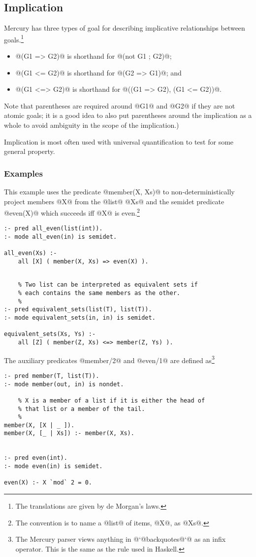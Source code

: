 \documentclass[a4paper,11pt,notitlepage,onecolumn]{article}
\begin{document}
\subsection{Implication}

Mercury has three types of goal for describing implicative
relationships between goals.\footnote{The translations are given by de Morgan's laws.}
\begin{itemize}
\item @(G1 => G2)@ is shorthand for @(not G1 ; G2)@;
\item @(G1 <= G2)@ is shorthand for @(G2 => G1)@; and
\item @(G1 <=> G2)@ is shorthand for @((G1 => G2), (G1 <= G2))@.
\end{itemize}

Note that parentheses are required around @G1@ and @G2@ if they
are not atomic goals; it is a good idea to also put
parentheses around the implication as a whole to avoid
ambiguity in the scope of the implication.)

Implication is most often used with universal quantification
to test for some general property.

\subsubsection{Examples}

This example uses the predicate @member(X, Xs)@ to non-deterministically
project members @X@ from the @list@ @Xs@ and the semidet predicate
@even(X)@ which succeeds iff @X@ is even.\footnote{The convention is to
name a @list@ of items, @X@, as @Xs@.}
\begin{verbatim}
:- pred all_even(list(int)).
:- mode all_even(in) is semidet.

all_even(Xs) :-
    all [X] ( member(X, Xs) => even(X) ).

\end{verbatim}

\begin{verbatim}

    % Two list can be interpreted as equivalent sets if
    % each contains the same members as the other.
    %
:- pred equivalent_sets(list(T), list(T)).
:- mode equivalent_sets(in, in) is semidet.

equivalent_sets(Xs, Ys) :-
    all [Z] ( member(Z, Xs) <=> member(Z, Ys) ).
\end{verbatim}
The auxiliary predicates @member/2@ and @even/1@ are defined as\footnote{The Mercury parser views anything in @`@backquotes@`@
as an infix operator.  This is the same as the rule used in Haskell.}
\begin{verbatim}
:- pred member(T, list(T)).
:- mode member(out, in) is nondet.

    % X is a member of a list if it is either the head of
    % that list or a member of the tail.
    %
member(X, [X | _ ]).
member(X, [_ | Xs]) :- member(X, Xs).


:- pred even(int).
:- mode even(in) is semidet.

even(X) :- X `mod` 2 = 0.
\end{verbatim}
\end{document}
